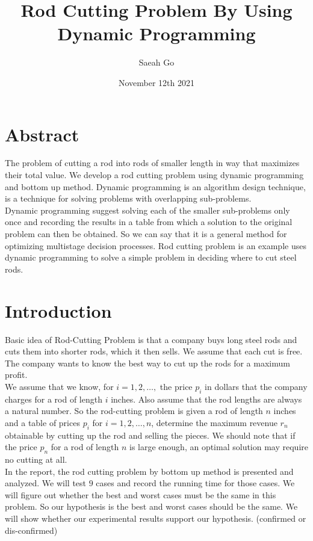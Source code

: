 \documentclass{article}
\title{\textbf{Rod Cutting Problem By Using Dynamic Programming}}
\author{Saeah Go}
\date{November 12th 2021}
\begin{document}
\maketitle

\section{\textbf{Abstract}}
\indent \indent The problem of cutting a rod into rods of smaller length in way that maximizes their total value. We develop a rod cutting problem using dynamic programming and bottom up method. Dynamic programming is an algorithm design technique, is a technique for solving problems with overlapping sub-problems. \\ \indent Dynamic programming suggest solving each of the smaller sub-problems only once and recording the results in a table from which a solution to the original problem can then be obtained. So we can say that it is a general method for optimizing multistage decision processes. Rod cutting problem is an example uses dynamic programming to solve a simple problem in deciding where to cut steel rods. \\

\section{\textbf{Introduction}}
\indent \indent Basic idea of Rod-Cutting Problem is that a company buys long steel rods and cuts them into shorter rods, which it then sells. We assume that each cut is free. The company wants to know the best way to cut up the rods for a maximum profit. \\
\indent We assume that we know, for $i = 1, 2, \ldots ,$ the price $p_i$ in dollars that the company charges for a rod of length $i$ inches. Also assume that the rod lengths are always a natural number. So the rod-cutting problem is given a rod of length $n$ inches and a table of prices $p_i$ for $i = 1, 2, \ldots, n$, determine the maximum revenue $r_n$ obtainable by cutting up the rod and selling the pieces. We should note that if the price $p_n$ for a rod of length $n$ is large enough, an optimal solution may require no cutting at all. \\
\indent In the report, the rod cutting problem by bottom up method is presented and analyzed. We will test $9$ cases and record the running time for those cases. We will figure out whether the best and worst cases must be the same in this problem. So our hypothesis is the best and worst cases should be the same. We will show whether our experimental results support our hypothesis. (confirmed or dis-confirmed) 
\end{document}
